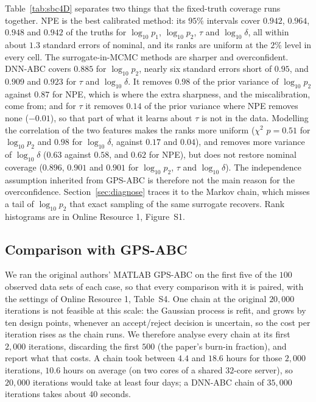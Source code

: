 \documentclass[sn-basic,iicol,pdflatex]{sn-jnl}
\begin{document}
\begin{table}[t]
\centering
\caption{Simulation-based calibration over $500$ prior draws ($364$ with $\bar d>0$; binomial s.e.\ of a coverage
near $0.95$ is $0.011$). Coverage is of central $50$, $90$ and $95\%$ intervals; the rank $p$-value is of a
$\chi^2$ test of uniformity on ten bins (a graphical alternative is the ECDF-difference test of \citealp{sailynoja2022}); contraction is the share of prior variance removed.}
\label{tab:sbc4D}
\small

\end{table}

Table~\ref{tab:sbc4D} separates two things that the fixed-truth coverage runs together. NPE is the best
calibrated method: its $95\%$ intervals cover $0.942$, $0.964$, $0.948$ and $0.942$ of the truths for
$\log_{10}p_1$, $\log_{10}p_2$, $\tau$ and $\log_{10}\delta$, all within about $1.3$ standard errors of nominal, and
its ranks are uniform at the $2\%$ level in every cell. The surrogate-in-MCMC methods are sharper and
overconfident. DNN-ABC covers $0.885$ for $\log_{10}p_2$, nearly six standard errors short of $0.95$, and $0.909$ and
$0.923$ for $\tau$ and $\log_{10}\delta$. It removes $0.98$ of the prior variance of $\log_{10}p_2$ against $0.87$ for NPE, which is where
the extra sharpness, and the miscalibration, come from; and for $\tau$ it removes $0.14$ of the prior variance where NPE removes
none ($-0.01$), so that part of what it learns about $\tau$ is not in the data. Modelling the correlation of the two features
makes the ranks more uniform ($\chi^2$ $p=0.51$ for $\log_{10}p_2$ and $0.98$ for $\log_{10}\delta$, against $0.17$ and $0.04$),
and removes more variance of $\log_{10}\delta$ ($0.63$ against $0.58$, and $0.62$ for NPE), but does not restore nominal
coverage ($0.896$, $0.901$ and $0.901$ for $\log_{10}p_2$, $\tau$ and $\log_{10}\delta$). The independence assumption inherited from GPS-ABC is therefore not the main
reason for the overconfidence. Section~\ref{sec:diagnose} traces it to the Markov chain, which misses a tail of $\log_{10}p_2$ that exact sampling of the same surrogate recovers.
Rank histograms are in Online Resource 1, Figure~S1.


\subsection{Comparison with GPS-ABC}
\label{sec:gps}

We ran the original authors' MATLAB GPS-ABC on the first five of the $100$ observed data sets of each case, so that
every comparison with it is paired, with the settings of Online Resource 1, Table~S4. One chain at the original $20{,}000$
iterations is not feasible at this scale: the Gaussian process is refit, and grows by ten design points, whenever an accept/reject
decision is uncertain, so the cost per iteration rises as the chain runs. We therefore analyse every chain at its first $2{,}000$
iterations, discarding the first $500$ (the paper's burn-in fraction), and report what that costs. A chain took between
$4.4$ and $18.6$ hours for those $2{,}000$ iterations, $10.6$ hours on average (on two cores of a shared $32$-core server), so
$20{,}000$ iterations would take at least four days; a DNN-ABC chain of $35{,}000$ iterations takes about $40$ seconds.
\end{document}
